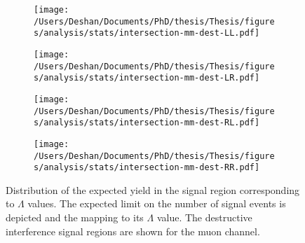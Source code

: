 \begin{figure}[h!]
    \centering
    \begin{subfigure}[b]{0.49\textwidth}
        \centering
        \texttt{[image: /Users/Deshan/Documents/PhD/thesis/Thesis/figures/analysis/stats/intersection-mm-dest-LL.pdf]}
        \label{fig:bkgmodel:interpmm5}
    \end{subfigure}
    \begin{subfigure}[b]{0.49\textwidth}
        \centering
        \texttt{[image: /Users/Deshan/Documents/PhD/thesis/Thesis/figures/analysis/stats/intersection-mm-dest-LR.pdf]}
        \label{fig:bkgmodel:interpmm6}
    \end{subfigure}
    \begin{subfigure}[b]{0.49\textwidth}
        \centering
        \texttt{[image: /Users/Deshan/Documents/PhD/thesis/Thesis/figures/analysis/stats/intersection-mm-dest-RL.pdf]}
        \label{fig:bkgmodel:interpmm7}
    \end{subfigure}
    \begin{subfigure}[b]{0.49\textwidth}
        \centering
        \texttt{[image: /Users/Deshan/Documents/PhD/thesis/Thesis/figures/analysis/stats/intersection-mm-dest-RR.pdf]}
        \label{fig:bkgmodel:interpmm8}
    \end{subfigure}
    \caption{Distribution of the expected yield in the signal region corresponding to $\Lambda$ values. The expected limit on the number of signal events is depicted and the mapping to its $\Lambda$ value. The destructive interference signal regions are shown for the muon channel.}
    \label{fig:stats:interpmmdest}
\end{figure}

